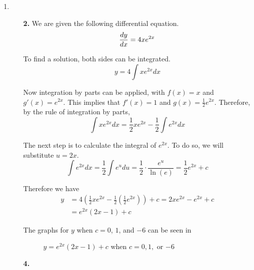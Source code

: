 \documentclass[fleqn]{article}
\begin{document}
\begin{enumerate}[label=\textbf{\Alph*.}]
\begin{enumerate}
		\end{enumerate}

	\item
		\begin{enumerate}
			\item[\textbf{2.}]
				We are given the following differential equation.
				\[
					\frac{dy}{dx} = 4xe^{2x}
				\]

				To find a solution, both sides can be integrated.
				\[
					y = 4 \int xe^{2x} dx
				\]

				Now integration by parts can be applied, with \(f(x) = x\) and \(g'(x) = e^{2x}\). This implies that \(f'(x) = 1\) and \(g(x) = \frac{1}{2}e^{2x}\). Therefore, by the rule of integration by parts,
				\[
					\int xe^{2x} dx = \frac{1}{2}xe^{2x} - \frac{1}{2} \int e^{2x} dx
				\]

				The next step is to calculate the integral of \(e^{2x}\). To do so, we will substitute \(u = 2x\).
				\[
					\int e^{2x} dx = \frac{1}{2} \int e^u du = \frac{1}{2} \cdot \frac{e^u}{\ln(e)} = \frac{1}{2} e^{2x} + c
				\]

				Therefore we have
				\begin{align*}
					y & = 4 \left(\frac{1}{2}xe^{2x} - \frac{1}{2} \left(\frac{1}{2} e^{2x}\right)\right) + c = 2xe^{2x} - e^{2x} + c \\
					  & = e^{2x} (2x-1) + c
				\end{align*}

				The graphs for \(y\) when \(c = 0\), \(1\), and \(-6\) can be seen in

				\begin{figure}[htb]
					\centering
					\caption{\(y = e^{2x} (2x-1) + c\) when \(c = 0, 1,\) or \(-6\)}
					\label{qb2}
				\end{figure}


			\item[\textbf{4.}]
		\end{enumerate}
\end{enumerate}
\end{document}
